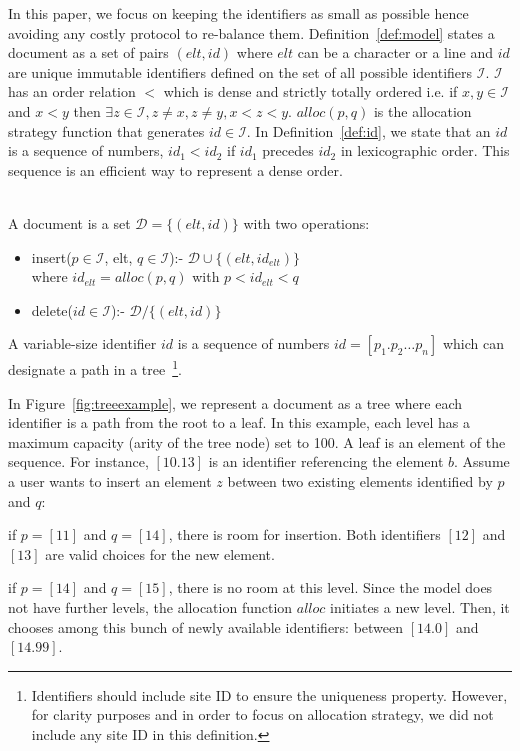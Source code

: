 In this paper, we focus on keeping the identifiers as small as possible hence
avoiding any costly protocol to re-balance them. Definition~\ref{def:model}
states a document as a set of pairs $(elt, id)$ where $elt$ can be a character
or a line and $id$ are unique immutable identifiers defined on the set of all
possible identifiers $\mathcal{I}$. $\mathcal{I}$ has an order relation $<$
which is dense and strictly totally ordered i.e. if $x,y \in \mathcal{I}$ and
$x < y$ then $\exists z \in \mathcal{I}, z\neq x, z\neq y, x < z <
y$. $alloc(p,q)$ is the allocation strategy function that generates $id \in
\mathcal{I}$. In Definition~\ref{def:id}, we state that an $id$ is a sequence
of numbers, $id_1<id_2$ if $id_1 $ precedes $id_2$ in lexicographic order. This
sequence is an efficient way to represent a dense order.

\begin{Def}\ \\
A document is a set $\mathcal{D} = \{ (elt, id) \}$ with two operations:
\begin{itemize}
  \item insert($p \in \mathcal{I}$, elt, $q \in
    \mathcal{I}$):- $\mathcal{D} \cup \{(elt,id_{elt})\}$ \\ where
    $id_{elt}=alloc(p,q)$ with $p<id_{elt}<q$
  \item delete($id \in \mathcal{I}$):- $\mathcal{D}/\{(elt,id)\}$
\end{itemize}
\label{def:model}
\end{Def}

\begin{Def}
  A variable-size identifier $id$ is a sequence of numbers $id=[p_1.p_2\ldots
    p_n]$ which can designate a path in a tree~\footnote{Identifiers should
    include site ID to ensure the uniqueness property. However, for clarity
    purposes and in order to focus on allocation strategy, we did not
    include any site ID in this definition.}.
\label{def:id}
\end{Def}

In Figure~\ref{fig:treeexample}, we represent a document as a tree where each
identifier is a path from the root to a leaf. In this example, each level has a
maximum capacity (arity of the tree node) set to 100. A leaf is an element of
the sequence. For instance, $[10.13]$ is an identifier referencing the element
$b$.  Assume a user wants to insert an element $z$ between two existing
elements identified by $p$ and $q$:
\begin{asparaitem}
\item if $p=[11]$ and $q=[14]$, there is room for insertion. Both identifiers
  $[12]$ and $[13]$ are valid choices for the new element.
\item if $p=[14]$ and $q=[15]$, there is no room at this level. Since the model
  does not have further levels, the allocation function $alloc$ initiates a new
  level. Then, it chooses among this bunch of newly available identifiers:
  between $[14.0]$ and $[14.99]$.
\end{asparaitem}

